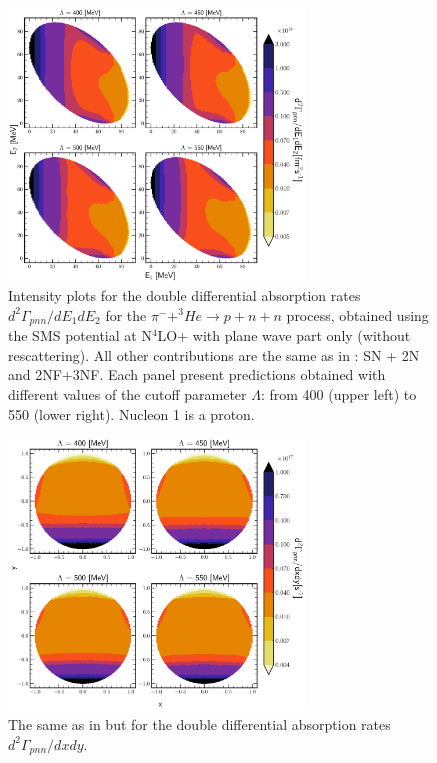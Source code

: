     \begin{figure}[h]
        \begin{center}
        \includegraphics[width=0.7\textwidth]{PlotData/PION/Dalitz_maps/figures/Dalitz_map_pnn_E1E2_cutofs_PWIAS.pdf}
        \end{center}
        \caption{Intensity plots for the double differential absorption rates
        $d^2 \Gamma_{pnn}/dE_1dE_2$ for the $\pi^- + ^3He \rightarrow p + n + n$
        process, obtained using the SMS potential at N$^4$LO+
        with plane wave part only (without rescattering).
        All other contributions are the same as in : SN + 2N and 2NF+3NF.
        Each panel present predictions obtained with different values of the cutoff parameter $\Lambda$:
        from \SI{400}{\mev} (upper left) to \SI{550}{\mev} (lower right). Nucleon 1 is a proton.}
        \label{pion_map_E1E2_cutoff_PW}
    \end{figure}

    \begin{figure}[h]
        \begin{center}
        \includegraphics[width=0.7\textwidth]{PlotData/PION/Dalitz_maps/figures/Dalitz_map_pnn_xy_cutofs_PWIAS.pdf}
        \end{center}
        \caption{The same as in  but for the double differential absorption rates
        $d^2 \Gamma_{pnn}/dxdy$.}
        \label{pion_map_xy_cutoff_PW}
    \end{figure}

